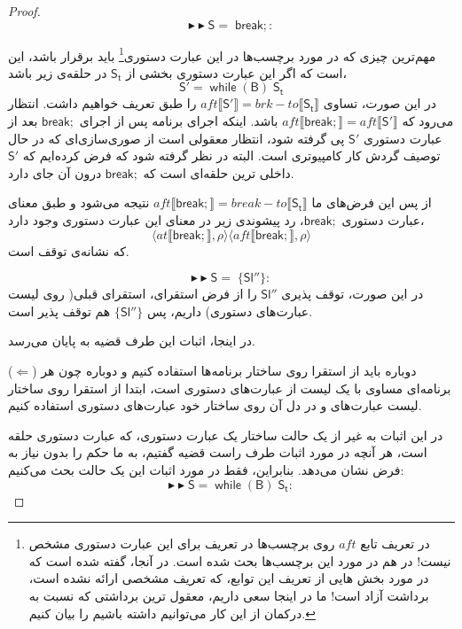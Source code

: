 \begin{proof}
$$\blacktriangleright\blacktriangleright \mathsf{S=\; break;}:$$

مهم‌ترین چیزی که در مورد برچسب‌ها در این عبارت‌ دستوری\footnote{
در تعریف تابع $aft$ روی برچسب‌ها در \cite{calcul} تعریف برای این عبارت‌ دستوری مشخص نیست! در \cite{cousotbook} هم در مورد این برچسب‌ها بحث شده است. در آنجا، گفته شده است که در مورد بخش هایی از تعریف این توابع، که تعریف مشخصی ارائه نشده است، برداشت آزاد است! ما در اینجا سعی داریم، معقول ترین برداشتی که نسبت به درکمان از این کار می‌توانیم داشته باشیم را بیان کنیم.
} باید برقرار باشد، این است که اگر این عبارت‌ دستوری بخشی از $\mathsf{S_t}$ در حلقه‌ی زیر باشد،
$$\mathsf{S'=\; while\; (B)\; S_t}$$
در این صورت، تساوی 
$aft \llbracket \mathsf{S'} \rrbracket = brk-to \llbracket \mathsf{S_t} \rrbracket $
را طبق تعریف خواهیم داشت. انتظار می‌رود که\break 
$aft \llbracket \mathsf{break;} \rrbracket = aft \llbracket \mathsf{S'} \rrbracket$ 
باشد. اینکه اجرای برنامه پس از اجرای $\mathsf{break;}$ بعد از عبارت دستوری $\mathsf{S'}$ پی گرفته شود، انتظار معقولی است از صوری‌سازی‌ای که در حال توصیف گردش کار کامپیوتری است. البته در نظر گرفته شود که فرض کرده‌ایم که $\mathsf{S'}$ داخلی ترین حلقه‌ای است که $\mathsf{break;}$ درون آن جای دارد.

 از پس این فرض‌های ما 
$aft \llbracket \mathsf{break;} \rrbracket = break-to \llbracket \mathsf{S_t} \rrbracket$ 
نتیجه می‌شود و طبق معنای عبارت دستوری 
$\mathsf{break;}$،
رد پیشوندی زیر در معنای این عبارت‌ دستوری وجود دارد،
$$\langle at \llbracket \mathsf{break;} \rrbracket , \rho \rangle
\langle aft \llbracket \mathsf{break;} \rrbracket , \rho \rangle$$
 که نشانه‌ی توقف است.
 

$$\blacktriangleright\blacktriangleright \mathsf{S=\; \{ Sl'' \}}:$$
	در این صورت، توقف پذیری $\mathsf{Sl''}$ را از فرض استقرای، استقرای قبلی( روی لیست عبارت‌های دستوری) داریم، پس $\mathsf{\{Sl''\}}$ هم توقف پذیر است.
	
	
در اینجا، اثبات این طرف قضیه به پایان می‌رسد.

($\Leftarrow$)
دوباره باید از استقرا روی ساختار برنامه‌ها استفاده کنیم و دوباره چون هر برنامه‌ای مساوی با یک لیست از عبارت‌های دستوری است، ابتدا از استقرا روی ساختار لیست عبارت‌های و در دل آن روی ساختار خود عبارت‌های دستوری استفاده کنیم.

در این اثبات به غیر از یک حالت ساختار یک عبارت‌ دستوری، که عبارت‌ دستوری حلقه است، هر آنچه در مورد اثبات طرف راست قضیه گفتیم، به ما حکم را بدون نیاز به فرض نشان می‌دهد. بنابراین، فقط در مورد اثبات این یک حالت بحث می‌کنیم: 
$$\blacktriangleright\blacktriangleright \mathsf{S=\; while\; (B)\; S_t}:$$


\end{proof}
